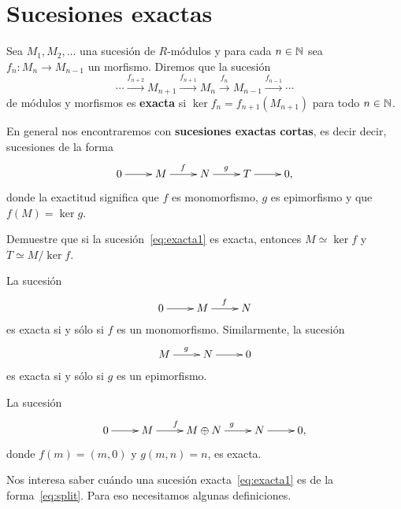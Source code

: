 \chapter{Sucesiones exactas}

\begin{definition}
Sea $M_1,M_2,\dots$ una sucesión de $R$-módulos y para cada $n\in\mathbb{N}$ sea
$f_n\colon M_n\to M_{n-1}$ un morfismo. Diremos que la sucesión
\[
\cdots\xrightarrow{f_{n+2}}M_{n+1}\xrightarrow{f_{n+1}}M_n\xrightarrow{f_n}M_{n-1}\xrightarrow{f_{n-1}}\cdots
\]
de módulos y morfismos 
es \textbf{exacta} si $\ker f_n=f_{n+1}(M_{n+1})$ para todo $n\in\mathbb{N}$. 
\end{definition}

En general nos encontraremos con \textbf{sucesiones exactas cortas}, es decir 
decir, sucesiones de la forma
	\begin{equation}
	\label{eq:exacta1}	
		\xymatrix{
        0\ar[r]
        & M
        \ar[r]^f
        & N
        \ar[r]^g
        & T\ar[r]
        & 0,
        }
  	\end{equation}
donde la exactitud significa que $f$ es monomorfismo, $g$ es epimorfismo y que $f(M)=\ker g$. 

\begin{exercise}
Demuestre que si la sucesión~\eqref{eq:exacta1} es exacta, entonces $M\simeq\ker f$ y $T\simeq M/\ker f$.
\end{exercise}

\begin{examples}
La sucesión 
\[
		\xymatrix{
        0\ar[r]
        & M
        \ar[r]^f
        & N
        }
\]
es exacta si y sólo si $f$ es un monomorfismo. Similarmente, la sucesión
\[
		\xymatrix{
        M
        \ar[r]^g
        & N
        \ar[r]
        & 0
        }
\]
es exacta si y sólo si $g$ es un epimorfismo.
\end{examples}

\begin{example}
La sucesión
\begin{equation}
\label{eq:split}
			\xymatrix{
        0\ar[r]
        & M
        \ar[r]^f
        & M\oplus N
        \ar[r]^g
        & N\ar[r]
        & 0,
        }
\end{equation}
donde $f(m)=(m,0)$ y $g(m,n)=n$, es exacta.
\end{example}

Nos interesa saber cuándo una sucesión exacta~\ref{eq:exacta1} es de la forma~\eqref{eq:split}. Para eso
necesitamos algunas definiciones.


